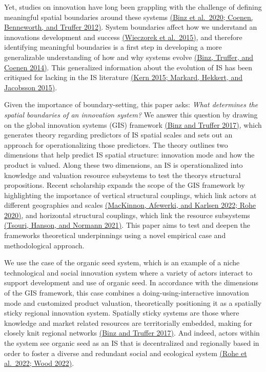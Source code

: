 \documentclass[twoside,12pt,final]{ucthesis-CA2012}
\begin{document}
\begin{ucmainmatter}
Yet, studies on innovation have long been grappling with the challenge
of defining meaningful spatial boundaries around these systems \href{https://www.zotero.org/google-docs/?EKKuoG}{(Binz et
al.~2020; Coenen, Benneworth, and Truffer
2012)}. System boundaries
affect how we understand an innovation\textquotesingle s development and success
\href{https://www.zotero.org/google-docs/?ZrF5pd}{(Wieczorek et al.~2015)},
and therefore identifying meaningful boundaries is a first step in
developing a more generalizable understanding of how and why systems
evolve \href{https://www.zotero.org/google-docs/?LbuTKV}{(Binz, Truffer, and Coenen
2014)}. This generalized
information about the evolution of IS has been critiqued for lacking in
the IS literature \href{https://www.zotero.org/google-docs/?nb8jPk}{(Kern 2015; Markard, Hekkert, and Jacobsson
2015)}.

Given the importance of boundary-setting, this paper asks: \emph{What
determines the spatial boundaries of an innovation system?} We answer
this question by drawing on the \textquotesingle global innovation systems\textquotesingle{} (GIS)
framework \href{https://www.zotero.org/google-docs/?Oj8YDC}{(Binz and Truffer
2017)}, which generates
theory regarding predictors of IS spatial scales and sets out an
approach for operationalizing those predictors. The theory outlines two
dimensions that help predict IS spatial structure: innovation \textquotesingle mode\textquotesingle{}
and how the product is valued. Along these two dimensions, an IS is
operationalized into knowledge and valuation resource subsystems to test
the theory\textquotesingle s structural propositions. Recent scholarship expands the
scope of the GIS framework by highlighting the importance of vertical
structural couplings, which link actors at different geographies and
scales \href{https://www.zotero.org/google-docs/?oAg15h}{(MacKinnon, Afewerki, and Karlsen 2022; Rohe
2020)}, and horizontal
structural couplings, which link the resource subsystems \href{https://www.zotero.org/google-docs/?s7idFr}{(Tsouri,
Hanson, and Normann 2021)}.
This paper aims to test and deepen the framework\textquotesingle s theoretical
underpinnings using a novel empirical case and methodological approach.

We use the case of the organic seed system, which is an example of a
niche technological and social innovation system where a variety of
actors interact to support development and use of organic seed. In
accordance with the dimensions of the GIS framework, this case combines
a \textquotesingle doing-using-interactive\textquotesingle{} innovation mode and customized product
valuation, theoretically positioning it as a \textquotesingle spatially sticky\textquotesingle{}
regional innovation system. Spatially sticky systems are those where
knowledge and market related resources are territorially embedded,
making for closely knit regional networks \href{https://www.zotero.org/google-docs/?eQpOby}{(Binz and Truffer
2017)}. And indeed, actors
within the system see organic seed as an IS that is decentralized and
regionally based in order to foster a diverse and redundant social and
ecological system \href{https://www.zotero.org/google-docs/?4WRuI1}{(Rohe et al.~2022; Wood
2022)}.


\end{ucmainmatter}
\end{document}
